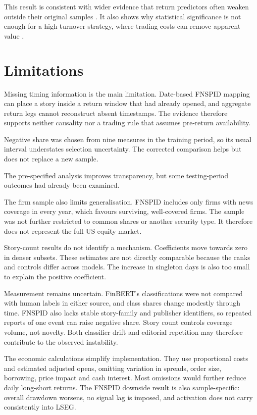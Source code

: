This result is consistent with wider evidence that return predictors often
weaken outside their original samples \citep{welch2008,mclean2016}. It also shows
why statistical significance is not enough for a high-turnover strategy, where
trading costs can remove apparent value \citep{korajczyk2004,novymarx2016}.

\section{Limitations}

Missing timing information is the main limitation. Date-based FNSPID mapping can
place a story inside a return window that had already opened, and aggregate
return legs cannot reconstruct absent timestamps. The evidence therefore
supports neither causality nor a trading rule that assumes pre-return
availability.

Negative share was chosen from nine measures in the training period, so its
usual interval understates selection uncertainty. The corrected comparison
helps but does not replace a new sample.

The pre-specified analysis improves transparency, but some testing-period
outcomes had already been examined.

The firm sample also limits generalisation. FNSPID includes only firms with news
coverage in every year, which favours surviving, well-covered firms. The sample
was not further restricted to common shares or another security type. It
therefore does not represent the full US equity market.

Story-count results do not identify a mechanism. Coefficients move towards zero
in denser subsets. These estimates are not directly comparable because the ranks
and controls differ across models. The increase in singleton days is also too
small to explain the positive coefficient.

Measurement remains uncertain. FinBERT's classifications were not compared with
human labels in either source, and class shares change modestly through time.
FNSPID also lacks stable
story-family and publisher identifiers, so repeated reports of one event can
raise negative share. Story count controls coverage volume, not novelty. Both
classifier drift and editorial repetition may therefore contribute to the
observed instability.

The economic calculations simplify implementation. They use proportional costs
and estimated adjusted opens, omitting variation in spreads, order size,
borrowing, price impact and cash interest. Most omissions would further reduce
daily long-short returns. The FNSPID downside result is also sample-specific:
overall drawdown worsens, no signal lag is imposed, and activation does not carry
consistently into LSEG.

